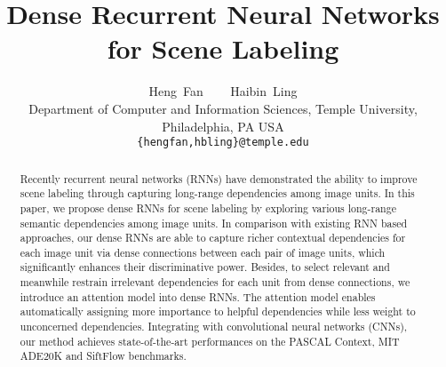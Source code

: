 \documentclass[10pt,twocolumn,letterpaper]{article}
\begin{document}
\title{Dense Recurrent Neural Networks for Scene Labeling}

\author{Heng~Fan ~~~ Haibin~Ling\\
Department of Computer and Information Sciences, Temple University, Philadelphia, PA USA\\
{\tt\small \{hengfan,hbling\}@temple.edu}
}

\maketitle
\thispagestyle{empty}

\begin{abstract}
  Recently recurrent neural networks (RNNs) have demonstrated the ability to improve scene labeling through capturing long-range dependencies among image units. In this paper, we propose dense RNNs for scene labeling by exploring various long-range semantic dependencies among image units. In comparison with existing RNN based approaches, our dense RNNs are able to capture richer contextual dependencies for each image unit via dense connections between each pair of image units, which significantly enhances their discriminative power. Besides, to select relevant and meanwhile restrain irrelevant dependencies for each unit from dense connections, we introduce an attention model into dense RNNs. The attention model enables automatically assigning more importance to helpful dependencies while less weight to unconcerned dependencies. Integrating with convolutional neural networks (CNNs), our method achieves state-of-the-art performances on the PASCAL Context, MIT ADE20K and SiftFlow benchmarks.
  \end{abstract}
\end{document}
